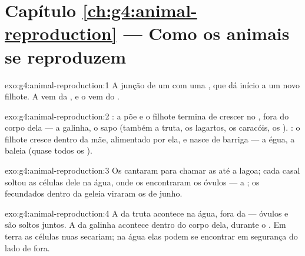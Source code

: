 \section*{Capítulo \ref{ch:g4:animal-reproduction} --- Como os animais se reproduzem}

\begin{solution}{exo:g4:animal-reproduction:1}
A junção de um  com uma ,
que dá início a um novo filhote. A  vem
da , e o  vem do .
\end{solution}

\begin{solution}{exo:g4:animal-reproduction:2}
: a  põe  e o filhote termina de crescer no ,
fora do corpo dela --- a galinha, o sapo (também a truta, os
lagartos, os caracóis, os ). : o filhote cresce
dentro da mãe, alimentado por ela, e nasce de barriga --- a égua, a
baleia (quase todos os ).
\end{solution}

\begin{solution}{exo:g4:animal-reproduction:3}
Os  cantaram para chamar as  até a lagoa; cada casal
soltou as células dele na água, onde os  encontraram
os óvulos --- a ; os  fecundados dentro da geleia
viraram os  de junho.
\end{solution}

\begin{solution}{exo:g4:animal-reproduction:4}
A da truta acontece na água, fora da  --- óvulos e
 são soltos juntos. A da galinha acontece dentro do
corpo dela, durante o . Em terra as células nuas
secariam; na água elas podem se encontrar em segurança do lado de
fora.
\end{solution}

